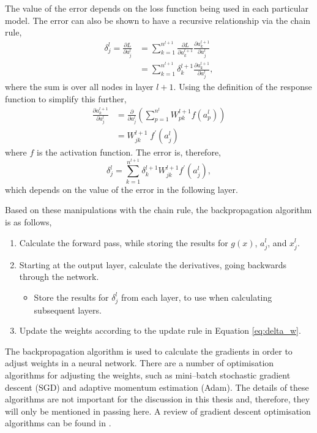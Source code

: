 The value of the error depends on the loss function being used in each 
particular model. The error can also be shown to have a recursive relationship 
via the chain rule,
\begin{align*}
		\delta^l_j = \frac{\partial L}{\partial a^l_j} &= \sum_{k=1}^{n^{l+1}} 
		\frac{\partial L}{\partial a^{l+1}_{k}}\frac{\partial a^{l+1}_k}{\partial 
		a^l_j}\\ 
		&= \sum^{n^{l+1}}_{k = 1} \delta^{l+1}_k \frac{\partial a^{l+1}_k}{\partial 
		a^l_j},
\end{align*}
where the sum is over all nodes in layer $l+1$. Using the definition of the 
response function to simplify this further,
\begin{align*}
		\frac{\partial a^{l+1}_k}{\partial a^l_j} &= \frac{\partial}{\partial a^l_j} 
		\left( \sum^{n^l}_{p=1} W^{l+1}_{pk} f(a^l_p) \right) \\ 
		&= W^{l+1}_{jk} \; f^\prime(a^l_j)
\end{align*}
where $f$ is the activation function. The error is, therefore,
\begin{equation*}
	\delta^l_j = \sum^{n^{l+1}}_{k=1} \delta^{l+1}_k W^{l+1}_{jk} f^\prime(a^l_j),
\end{equation*}
which depends on the value of the error in the following layer.

Based on these manipulations with the chain rule, the backpropagation 
algorithm is as follows,
\begin{enumerate}
	\item Calculate the forward pass, while storing the results for $g(x)$, 
		$a^l_j$, and $x^l_j$.
	\item Starting at the output layer, calculate the derivatives, going backwards
		through the network. 
	\begin{itemize}
		\item Store the results for $\delta^l_j$ from each layer, to use when 
			calculating subsequent layers.
	\end{itemize}
	\item Update the weights according to the update rule in Equation 
		\ref{eq:delta_w}.
\end{enumerate}

The backpropagation algorithm is used to calculate the gradients in order to
adjust weights in a neural network. There are a number of optimisation 
algorithms for adjusting the weights, such as mini--batch stochastic gradient 
descent (SGD)\cite{10.1145/2623330.2623612} and adaptive momentum estimation 
(Adam)\cite{KingmaD.P.2015AAMf}. The details of these algorithms are not 
important for the discussion in this thesis and, therefore, they will only be 
mentioned in passing here. A review of gradient descent optimisation 
algorithms can be found in \cite{ruder2016overview}. 

